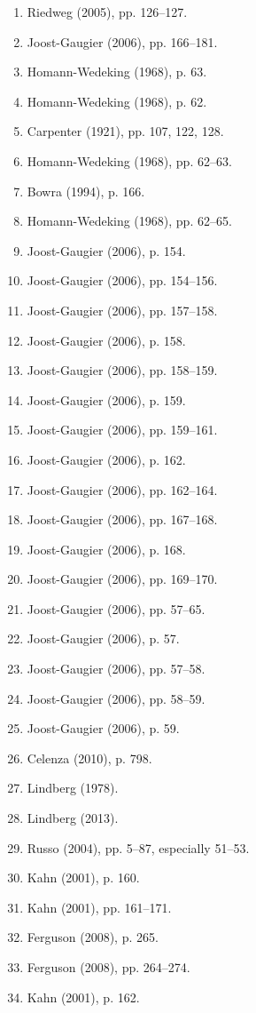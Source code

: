 \begin{enumerate}
\item Riedweg (2005), pp. 126–127.  
\item Joost-Gaugier (2006), pp. 166–181.  
\item Homann-Wedeking (1968), p. 63.  
\item Homann-Wedeking (1968), p. 62.  
\item Carpenter (1921), pp. 107, 122, 128.  
\item Homann-Wedeking (1968), pp. 62–63.  
\item Bowra (1994), p. 166.  
\item Homann-Wedeking (1968), pp. 62–65.  
\item Joost-Gaugier (2006), p. 154.  
\item Joost-Gaugier (2006), pp. 154–156.  
\item Joost-Gaugier (2006), pp. 157–158.  
\item Joost-Gaugier (2006), p. 158.  
\item Joost-Gaugier (2006), pp. 158–159.  
\item Joost-Gaugier (2006), p. 159.
\item Joost-Gaugier (2006), pp. 159–161.  
\item Joost-Gaugier (2006), p. 162.  
\item Joost-Gaugier (2006), pp. 162–164.  
\item Joost-Gaugier (2006), pp. 167–168.  
\item Joost-Gaugier (2006), p. 168.  
\item Joost-Gaugier (2006), pp. 169–170.  
\item Joost-Gaugier (2006), pp. 57–65.  
\item Joost-Gaugier (2006), p. 57.  
\item Joost-Gaugier (2006), pp. 57–58.  
\item Joost-Gaugier (2006), pp. 58–59.  
\item Joost-Gaugier (2006), p. 59.  
\item Celenza (2010), p. 798.  
\item Lindberg (1978).  
\item Lindberg (2013).  
\item Russo (2004), pp. 5–87, especially 51–53.  
\item Kahn (2001), p. 160.  
\item Kahn (2001), pp. 161–171.  
\item Ferguson (2008), p. 265.  
\item Ferguson (2008), pp. 264–274.  
\item Kahn (2001), p. 162.  

\end{enumerate}
